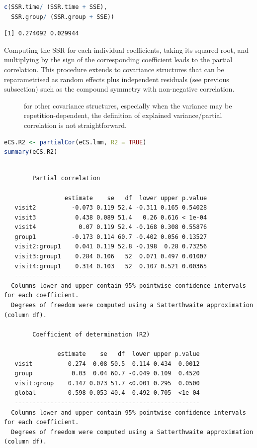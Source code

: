 \documentclass[12pt]{article}
\newcommand\Warning[1][3ex]{%
\renewcommand\stacktype{L}%
\scaleto{\stackon[1.3pt]{\color{red}$\triangle$}{\tiny\bfseries !}}{#1}%
\xspace
}
\begin{document}
\begin{lstlisting}[language=r,numbers=none]
c(SSR.time/ (SSR.time + SSE),
  SSR.group/ (SSR.group + SSE))
\end{lstlisting}

\label{}
\begin{verbatim}
[1] 0.274092 0.029944
\end{verbatim}


Computing the SSR for each individual coefficients, taking its squared
root, and multiplying by the sign of the corresponding coefficient
leads to the partial correlation. This procedure extends to covariance
structures that can be reparametrised as random effects plus
independent residuals (see previous subsection) such as the compound
symmetry with non-negative correlation.
\begin{description}
\item[{\Warning}] for other covariance structures, especially when the
variance may be repetition-dependent, the definition of explained
variance/partial correlation is not straightforward.
\end{description}
\begin{lstlisting}[language=r,numbers=none]
eCS.R2 <- partialCor(eCS.lmm, R2 = TRUE)
summary(eCS.R2)
\end{lstlisting}

\label{}
\begin{verbatim}

		Partial correlation 

                 estimate    se   df  lower upper p.value
   visit2          -0.073 0.119 52.4 -0.311 0.165 0.54028
   visit3           0.438 0.089 51.4   0.26 0.616 < 1e-04
   visit4            0.07 0.119 52.4 -0.168 0.308 0.55876
   group1          -0.173 0.114 60.7 -0.402 0.056 0.13527
   visit2:group1    0.041 0.119 52.8 -0.198  0.28 0.73256
   visit3:group1    0.284 0.106   52  0.071 0.497 0.01007
   visit4:group1    0.314 0.103   52  0.107 0.521 0.00365
   ------------------------------------------------------ 
  Columns lower and upper contain 95% pointwise confidence intervals for each coefficient.
  Degrees of freedom were computed using a Satterthwaite approximation (column df). 

		Coefficient of determination (R2)

               estimate    se   df  lower upper p.value
   visit          0.274  0.08 50.5  0.114 0.434  0.0012
   group           0.03  0.04 60.7 -0.049 0.109  0.4520
   visit:group    0.147 0.073 51.7 <0.001 0.295  0.0500
   global         0.598 0.053 40.4  0.492 0.705  <1e-04
   ---------------------------------------------------- 
  Columns lower and upper contain 95% pointwise confidence intervals for each coefficient.
  Degrees of freedom were computed using a Satterthwaite approximation (column df).
\end{verbatim}
\end{document}
